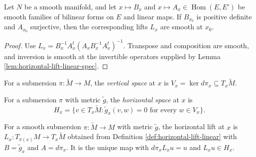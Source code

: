 \begin{lemma}
\label{lem:horizontal-lift-smooth-in-data}





Let $N$ be a smooth manifold, and let $x\mapsto B_x$ and $x\mapsto A_x\in\operatorname{Hom}(E,E')$ be smooth families of bilinear forms on $E$ and linear maps. If $B_{x_0}$ is positive definite and $A_{x_0}$ surjective, then the corresponding lifts $L_x$ are smooth at $x_0$.
\end{lemma}

\begin{proof}

\sketch Use $L_x=B_x^{-1}A_x^t(A_xB_x^{-1}A_x^t)^{-1}$. Transpose and composition are smooth, and inversion is smooth at the invertible operators supplied by Lemma \ref{lem:horizontal-lift-linear-spec}.
\end{proof}

\begin{definition}
\label{def:vertical-space}





For a submersion $\pi:\tilde M\to M$, the \emph{vertical space} at $x$ is $V_x=\ker d\pi_x\subseteq T_x\tilde M$.
\end{definition}

\begin{definition}
\label{def:horizontal-space}





For a submersion $\pi$ with metric $\tilde g$, the \emph{horizontal space} at $x$ is
\[
H_x=\{v\in T_x\tilde M:\tilde g_x(v,w)=0\text{ for every }w\in V_x\}.
\]
\end{definition}

\begin{definition}
\label{def:horizontal-lift-tangent}





For a smooth submersion $\pi:\tilde M\to M$ with metric $\tilde g$, the horizontal lift at $x$ is $L_x:T_{\pi(x)}M\to T_x\tilde M$ obtained from Definition \ref{def:horizontal-lift-linear} with $B=\tilde g_x$ and $A=d\pi_x$. It is the unique map with $d\pi_xL_xu=u$ and $L_xu\in H_x$.
\end{definition}

